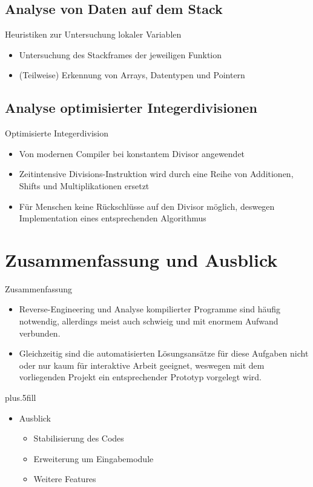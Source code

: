 \documentclass{beamer}
\begin{document}
\subsection{Analyse von Daten auf dem Stack}

\begin{frame}{Heuristiken zur Untersuchung lokaler Variablen}
  \begin{itemize}
  \item Untersuchung des Stackframes der jeweiligen Funktion
  \item (Teilweise) Erkennung von Arrays, Datentypen und Pointern
  \end{itemize}
\end{frame}

\subsection{Analyse optimisierter Integerdivisionen}

\begin{frame}{Optimisierte Integerdivision}
  \begin{itemize}
  \item Von modernen Compiler bei konstantem Divisor angewendet
  \item Zeitintensive Divisions-Instruktion wird durch eine Reihe von Additionen, Shifts und Multiplikationen ersetzt
  \item Für Menschen keine Rückschlüsse auf den Divisor möglich, deswegen Implementation eines entsprechenden Algorithmus
  \end{itemize}
\end{frame}

\section*{Zusammenfassung und Ausblick}

\begin{frame}{Zusammenfassung}

  \begin{itemize}
  \item Reverse-Engineering und Analyse kompilierter Programme sind häufig notwendig,
	allerdings meist auch schwieig und mit enormem Aufwand verbunden.
  \item Gleichzeitig sind die automatisierten Lösungsansätze für diese Aufgaben nicht
	oder nur kaum für interaktive Arbeit geeignet, weswegen mit dem vorliegenden
	Projekt ein entsprechender Prototyp vorgelegt wird.
  \end{itemize}
  
  \vskip0pt plus.5fill
  \begin{itemize}
  \item
    Ausblick
    \begin{itemize}
    \item Stabilisierung des Codes
    \item Erweiterung um Eingabemodule
    \item Weitere Features
    \end{itemize}
  \end{itemize}
\end{frame}
\end{document}

